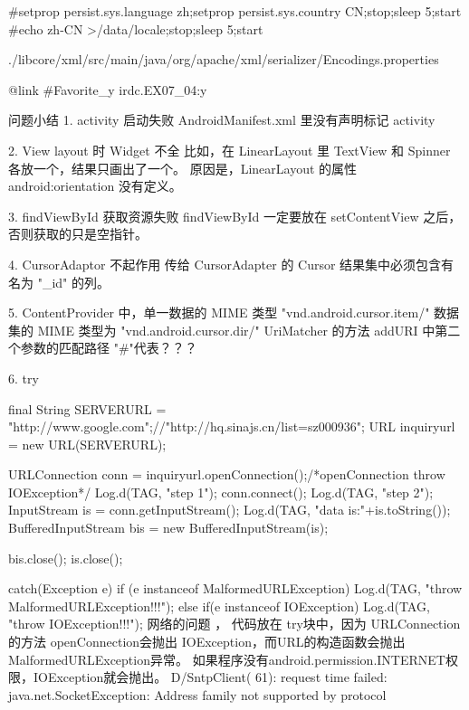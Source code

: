 \documentclass{book}
\begin{document}
\begin{CJK}{UTF8}{gbsn}
#setprop persist.sys.language zh;setprop persist.sys.country CN;stop;sleep
5;start
#echo zh-CN >/data/locale;stop;sleep 5;start

./libcore/xml/src/main/java/org/apache/xml/serializer/Encodings.properties


{@link #Favorite_y irdc.EX07_04:y}


问题小结
1. activity 启动失败
AndroidManifest.xml 里没有声明标记 activity

2. View layout 时 Widget 不全
比如，在 LinearLayout 里 TextView 和 Spinner 各放一个，结果只画出了一个。
原因是，LinearLayout 的属性 android:orientation 没有定义。

3. findViewById 获取资源失败
findViewById 一定要放在 setContentView 之后，否则获取的只是空指针。

4. CursorAdaptor 不起作用
传给 CursorAdapter 的 Cursor 结果集中必须包含有名为 "_id" 的列。

5. ContentProvider 中，单一数据的 MIME 类型 "vnd.android.cursor.item/"
数据集的 MIME 类型为 "vnd.android.cursor.dir/"
UriMatcher 的方法 addURI 中第二个参数的匹配路径 "#"代表？？？

6. 
   try{
                final String SERVERURL = "http://www.google.com";//"http://hq.sinajs.cn/list=sz000936";
                URL inquiryurl = new URL(SERVERURL);

                URLConnection conn = inquiryurl.openConnection();/*openConnection throw IOException*/
                Log.d(TAG, "step 1");
                conn.connect();
                Log.d(TAG, "step 2");
                InputStream is = conn.getInputStream();
                Log.d(TAG, "data is:"+is.toString());
                BufferedInputStream bis = new BufferedInputStream(is);

                bis.close();
                is.close();
                }catch(Exception e){
                    if (e instanceof MalformedURLException){
                    Log.d(TAG, "throw MalformedURLException!!!");
                    }
                    else if(e instanceof IOException){
                        Log.d(TAG, "throw IOException!!!");
                    }
                }
网络的问题 ， 代码放在 try块中，因为 URLConnection的方法 openConnection会抛出
IOException，而URL的构造函数会抛出MalformedURLException异常。
如果程序没有android.permission.INTERNET权限，IOException就会抛出。
D/SntpClient(   61): request time failed: java.net.SocketException: Address family not supported by protocol




\end{CJK}
\end{document}
